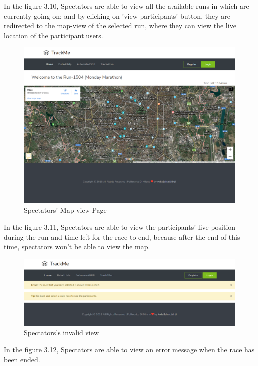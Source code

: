 \documentclass[a4paper, hidelinks, 12pt]{report}
\begin{document}
	In the figure 3.10, Spectators are able to view all the available runs in which are currently going on; and by clicking on 'view participants' button, they are redirected to the map-view of the selected run, where they can view the live location of the participant users.	
	
	\begin{figure}[H]
		\centering
		\includegraphics[scale=0.14]{UI/spectators_map.png}
		\caption[UI: Spectators' Map-view Page]{Spectators' Map-view Page}
		\label{fig:Spectators' Map-view Page}
	\end{figure}
	
	In the figure 3.11, Spectators are able to view  the participants' live position during the run and time left for the race to end, because after the end of this time, spectators won't be able to view the map.
	
	\begin{figure}[H]
		\centering
		\includegraphics[scale=0.35]{UI/spectator_invalid.png}
		\caption[UI: Spectators's invalid view]{Spectators's invalid view}
		\label{fig:Spectators's invalid view}
	\end{figure}
	
	In the figure 3.12, Spectators are able to view an error message when the race has been ended. 
	
\end{document}
